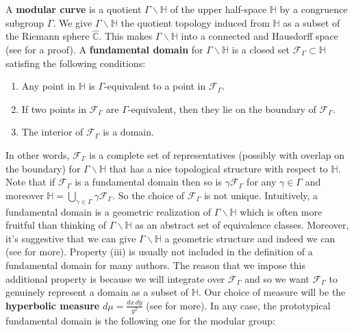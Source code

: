 \documentclass[12pt]{book}
\theoremstyle{definition}\newframedtheorem{method}{Method}
\newcommand{\mc}{\mathcal}
\newcommand{\C}{\mathbb{C}}
\renewcommand{\H}{\mathbb{H}}
\newcommand{\g}{\gamma}
\newcommand{\G}{\Gamma}
\newcommand{\<}{\langle}
\renewcommand{\>}{\rangle}
\newcommand{\GH}{\G\backslash\H}
\begin{document}
      A \textbf{modular curve} is a quotient $\GH$ of the upper half-space $\H$ by a congruence subgroup $\G$. We give $\GH$ the quotient topology induced from $\H$ as a subset of the Riemann sphere $\hat{\C}$. This makes $\GH$ into a connected and Hausdorff space (see \cite{diamond2005first} for a proof). A \textbf{fundamental domain} for $\GH$ is a closed set $\mc{F}_{\G} \subset \H$ satisfing the following conditions:
      \begin{enumerate}[label=(\roman*)]
        \item Any point in $\H$ is $\G$-equivalent to a point in $\mc{F}_{\G}$.
        \item If two points in $\mc{F}_{\G}$ are $\G$-equivalent, then they lie on the boundary of $\mc{F}_{\G}$.
        \item The interior of $\mc{F}_{\G}$ is a domain.
      \end{enumerate}
      In other words, $\mc{F}_{\G}$ is a complete set of representatives (possibly with overlap on the boundary) for $\GH$ that has a nice topological structure with respect to $\H$. Note that if $\mc{F}_{\G}$ is a fundamental domain then so is $\g\mc{F}_{\G}$ for any $\g \in \G$ and moreover $\H = \bigcup_{\g \in \G}\g\mc{F}_{\G}$. So the choice of $\mc{F}_{\G}$ is not unique. Intuitively, a fundamental domain is a geometric realization of $\GH$ which is often more fruitful than thinking of $\GH$ as an abstract set of equivalence classes. Moreover, it's suggestive that we can give $\GH$ a geometric structure and indeed we can (see \cite{diamond2005first} for more). Property (iii) is usually not included in the definition of a fundamental domain for many authors. The reason that we impose this additional property is because we will integrate over $\mc{F}_{\G}$ and so we want $\mc{F}_{\G}$ to genuinely represent a domain as a subset of $\H$. Our choice of measure will be the \textbf{hyperbolic measure} $d\mu = \frac{dx\,dy}{y^{2}}$ (see \cite{diamond2005first} for more). In any case, the prototypical fundamental domain is the following one for the modular group:
\end{document}
